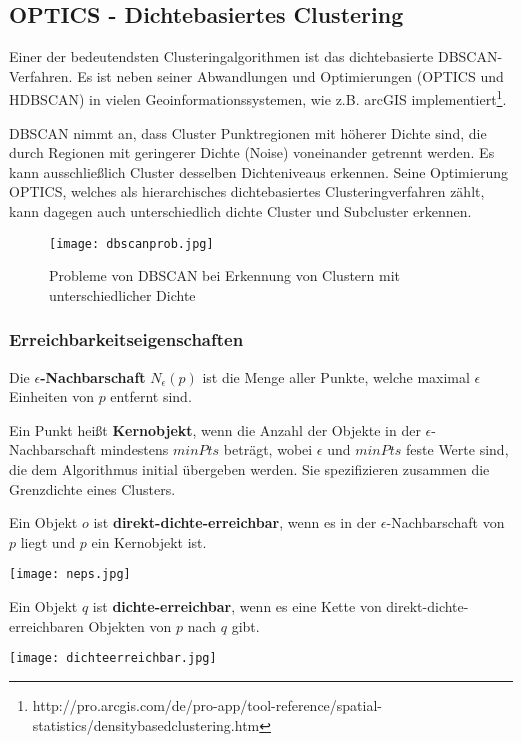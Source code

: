 \documentclass[11pt,ceqn]{book}
\begin{document}
\subsection{OPTICS - Dichtebasiertes Clustering}
Einer der bedeutendsten Clusteringalgorithmen ist das dichtebasierte DBSCAN-Verfahren. Es ist neben seiner Abwandlungen und Optimierungen (OPTICS und HDBSCAN) in vielen Geoinformationssystemen, wie z.B. arcGIS implementiert\footnote{http://pro.arcgis.com/de/pro-app/tool-reference/spatial-statistics/densitybasedclustering.htm}. 

DBSCAN nimmt an, dass Cluster Punktregionen mit höherer Dichte sind, die durch Regionen mit geringerer Dichte (Noise) voneinander getrennt werden. Es kann ausschließlich Cluster desselben Dichteniveaus erkennen. Seine Optimierung OPTICS, welches als hierarchisches dichtebasiertes Clusteringverfahren zählt, kann dagegen auch unterschiedlich dichte Cluster und Subcluster erkennen.

\begin{figure}[H]
\centering
\texttt{[image: dbscanprob.jpg]}
\caption{Probleme von DBSCAN bei Erkennung von Clustern mit unterschiedlicher Dichte}\label{cluster}
\end{figure}

\subsubsection{Erreichbarkeitseigenschaften \cite{dbscan}}
Die \textbf{$\epsilon$-Nachbarschaft} $N_\epsilon(p)$ ist die Menge aller Punkte, welche maximal $\epsilon$ Einheiten von $p$ entfernt sind.
 
Ein Punkt heißt \textbf{Kernobjekt}, wenn die Anzahl der Objekte in der $\epsilon$-Nachbarschaft mindestens $minPts$ beträgt, wobei $\epsilon$ und $minPts$ feste Werte sind, die dem Algorithmus initial übergeben werden. Sie spezifizieren zusammen die Grenzdichte eines Clusters.

\begin{minipage}{0.6\textwidth}\raggedright
Ein Objekt $o$ ist \textbf{direkt-dichte-erreichbar}, wenn es in der $\epsilon$-Nachbarschaft von $p$ liegt und $p$ ein Kernobjekt ist.
\end{minipage}
\hfill
\begin{minipage}{0.3\textwidth}
\texttt{[image: neps.jpg]}
\end{minipage}


\begin{minipage}{0.6\textwidth}\raggedright
Ein Objekt $q$ ist \textbf{dichte-erreichbar}, wenn es eine Kette von direkt-dichte-erreichbaren Objekten von $p$ nach $q$ gibt.
\end{minipage}
\hfill
\begin{minipage}{0.3\textwidth}
\texttt{[image: dichteerreichbar.jpg]}
\end{minipage}
\end{document}
